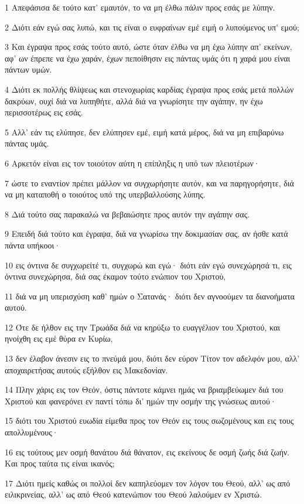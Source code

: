 \par 1 Απεφάσισα δε τούτο κατ' εμαυτόν, το να μη έλθω πάλιν προς εσάς με λύπην.
\par 2 Διότι εάν εγώ σας λυπώ, και τις είναι ο ευφραίνων εμέ ειμή ο λυπούμενος υπ' εμού;
\par 3 Και έγραψα προς εσάς τούτο αυτό, ώστε όταν έλθω να μη έχω λύπην απ' εκείνων, αφ' ων έπρεπε να έχω χαράν, έχων πεποίθησιν εις πάντας υμάς ότι η χαρά μου είναι πάντων υμών.
\par 4 Διότι εκ πολλής θλίψεως και στενοχωρίας καρδίας έγραψα προς εσάς μετά πολλών δακρύων, ουχί διά να λυπηθήτε, αλλά διά να γνωρίσητε την αγάπην, ην έχω περισσοτέρως εις εσάς.
\par 5 Αλλ' εάν τις ελύπησε, δεν ελύπησεν εμέ, ειμή κατά μέρος, διά να μη επιβαρύνω πάντας υμάς.
\par 6 Αρκετόν είναι εις τον τοιούτον αύτη η επίπληξις η υπό των πλειοτέρων·
\par 7 ώστε το εναντίον πρέπει μάλλον να συγχωρήσητε αυτόν, και να παρηγορήσητε, διά να μη καταποθή ο τοιούτος υπό της υπερβαλλούσης λύπης.
\par 8 Διά τούτο σας παρακαλώ να βεβαιώσητε προς αυτόν την αγάπην σας.
\par 9 Επειδή διά τούτο και έγραψα, διά να γνωρίσω την δοκιμασίαν σας, αν ήσθε κατά πάντα υπήκοοι·
\par 10 εις όντινα δε συγχωρείτέ τι, συγχωρώ και εγώ· διότι εάν εγώ συνεχώρησά τι, εις όντινα συνεχώρησα, διά σας έκαμον τούτο ενώπιον του Χριστού,
\par 11 διά να μη υπερισχύση καθ' ημών ο Σατανάς· διότι δεν αγνοούμεν τα διανοήματα αυτού.
\par 12 Ότε δε ήλθον εις την Τρωάδα διά να κηρύξω το ευαγγέλιον του Χριστού, και ηνοίχθη εις εμέ θύρα εν Κυρίω,
\par 13 δεν έλαβον άνεσιν εις το πνεύμά μου, διότι δεν εύρον Τίτον τον αδελφόν μου, αλλ' αποχαιρετήσας αυτούς εξήλθον εις Μακεδονίαν.
\par 14 Πλην χάρις εις τον Θεόν, όστις πάντοτε κάμνει ημάς να βριαμβεύωμεν διά του Χριστού και φανερόνει εν παντί τόπω δι' ημών την οσμήν της γνώσεως αυτού·
\par 15 διότι του Χριστού ευωδία είμεθα προς τον Θεόν εις τους σωζομένους και εις τους απολλυμένους·
\par 16 εις τούτους μεν οσμή θανάτου διά θάνατον, εις εκείνους δε οσμή ζωής διά ζωήν. Και προς ταύτα τις είναι ικανός;
\par 17 Διότι ημείς καθώς οι πολλοί δεν καπηλεύομεν τον λόγον του Θεού, αλλ' ως από ειλικρινείας, αλλ' ως από Θεού κατενώπιον του Θεού λαλούμεν εν Χριστώ.

